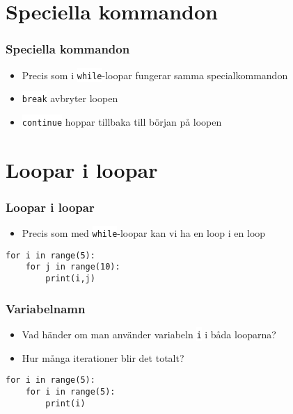 \documentclass[aspectratio=169]{beamer}
\newcommand{\code}[1]{\colorbox{white}{\lstinline{#1}}}
\begin{document}
\section{Speciella kommandon}

\begin{frame}
	\frametitle{Speciella kommandon}
	
	\begin{itemize}
		\item Precis som i \code{while}-loopar fungerar samma specialkommandon
		\item \code{break} avbryter loopen
		\item \code{continue} hoppar tillbaka till början på loopen 
	\end{itemize}
	
\end{frame}

\section{Loopar i loopar}

\begin{frame}[fragile]
	\frametitle{Loopar i loopar}
	
	\begin{itemize}
		\item Precis som med \code{while}-loopar kan vi ha en loop i en loop
	\end{itemize}
	
	\begin{lstlisting}
for i in range(5):
    for j in range(10):
        print(i,j)
	\end{lstlisting}
	
\end{frame}

\begin{frame}[fragile]
	\frametitle{Variabelnamn}
	
	\begin{itemize}
		\item Vad händer om man använder variabeln \code{i} i båda looparna?
		\item Hur många iterationer blir det totalt?
	\end{itemize}
	
	\begin{lstlisting}
for i in range(5):
    for i in range(5):
        print(i)
	\end{lstlisting}
	
\end{frame}
\end{document}
